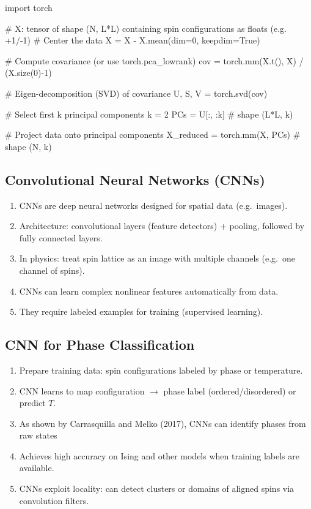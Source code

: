 \documentclass[%
oneside,                 %
final,                   %
10pt]{article}
\begin{document}
\bpycod
import torch

# X: tensor of shape (N, L*L) containing spin configurations as floats (e.g. +1/-1)
# Center the data
X = X - X.mean(dim=0, keepdim=True)

# Compute covariance (or use torch.pca_lowrank)
cov = torch.mm(X.t(), X) / (X.size(0)-1)

# Eigen-decomposition (SVD) of covariance
U, S, V = torch.svd(cov)

# Select first k principal components
k = 2
PCs = U[:, :k]  # shape (L*L, k)

# Project data onto principal components
X_reduced = torch.mm(X, PCs)  # shape (N, k)

\epycod


\subsection{Convolutional Neural Networks (CNNs)}

\begin{enumerate}
\item CNNs are deep neural networks designed for spatial data (e.g.~images).

\item Architecture: convolutional layers (feature detectors) + pooling, followed by fully connected layers.

\item In physics: treat spin lattice as an image with multiple channels (e.g.\ one channel of spins).

\item CNNs can learn complex nonlinear features automatically from data.

\item They require labeled examples for training (supervised learning).
\end{enumerate}

\noindent
\subsection{CNN for Phase Classification}
\begin{enumerate}
\item Prepare training data: spin configurations labeled by phase or temperature.

\item CNN learns to map configuration $\to$ phase label (ordered/disordered) or predict $T$.

\item As shown by Carrasquilla and Melko (2017), CNNs can identify phases from raw states 

\item Achieves high accuracy on Ising and other models when training labels are available.

\item CNNs exploit locality: can detect clusters or domains of aligned spins via convolution filters.
\end{enumerate}
\end{document}

